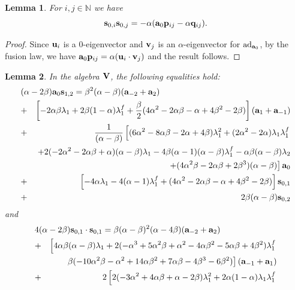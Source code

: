 \documentclass[a4paper]{amsart}
\newtheorem{lemma}{Lemma}[section]
\newcommand{\N}{{\mathbb N}}
\newcommand{\Vo}{{\bf V}}
\newcommand{\ad}{{\rm ad}}
\newcommand{\lmu}{\lambda_1}
\newcommand{\lmf}{\lambda_1^f}
\newcommand{\lmd}{\lambda_2}
\newcommand{\bv}{{\bf v}}
\newcommand{\ba}{{\bf a}}
\newcommand{\bu}{{\bf u}}
\newcommand{\bs}{{\bf s}}
\newcommand{\bp}{{\bf p}}
\newcommand{\bq}{{\bf q}}
\begin{document}
  \begin{lemma}
  \label{psi}
 For $i,j\in \N$ we have
 \begin{equation}\label{ss}
 \bs_{0,i} \bs_{0,j}=-\alpha (\ba_0\bp_{ij}- \alpha \bq_{ij}).
 \end{equation}
\end{lemma}
 \begin{proof}
Since $\bu_i$ is a $0$-eigenvector and $\bv_j$ is  an $\alpha$-eigenvector for $\ad_{\ba_0}$, 
 by the fusion law, we have $\ba_0\bp_{ij}=\alpha(\bu_i\cdot \bv_j)$ and the result follows.  
\end{proof}



\begin{lemma}
\label{a0s2f}
In the algebra $\Vo$, the following equalities hold:
\begin{eqnarray*}
\lefteqn{( \alpha-2   \beta)\ba_0\bs_{1,2}=\beta^2( \alpha- \beta)(\ba_{-2}+\ba_2)} \\
&+&\left [-2   \alpha   \beta   \lmu+2\beta(1- \alpha) \lmf+\frac{\beta}{2}(4   \alpha^2  -2   \alpha   \beta- \alpha   +4   \beta^2-2   \beta)\right ](\ba_1+\ba_{-1})\\
&+& \frac{1}{(\alpha-\beta)}\left [(6   \alpha^2-8   \alpha   \beta-2   \alpha+4   \beta)   \lmu^2+(2   \alpha^2-2   \alpha)   \lmu   \lmf \right .\\
&&+2(-2   \alpha^2-2   \alpha   \beta+ \alpha)(\alpha-\beta) \lmu-4\beta(   \alpha -1)(\alpha-\beta)   \lmf - \alpha   \beta(\alpha-\beta)   \lmd \\
&& \left .+(4   \alpha^2   \beta-2   \alpha   \beta+2   \beta^3)(\alpha-\beta)\right ]\ba_0\\
&+& \left [-4\alpha \lmu-4(\alpha-1)\lmf+(4\alpha^2-2   \alpha   \beta- \alpha+4   \beta^2-2   \beta)\right ]\bs_{0,1}\\
&+& 2\beta ( \alpha -  \beta)\bs_{0,2}
\end{eqnarray*}
and 
\begin{eqnarray*}
\lefteqn{4(\alpha-2\beta)\bs_{0,1} \cdot \bs_{0,1}=\beta(\alpha-\beta)^2(\alpha-4\beta)(\ba_{-2}+\ba_2)}\\
&+ &\left[4\alpha\beta(\alpha-\beta)\lmu+2(-\alpha^3+5\alpha^2\beta+\alpha^2-4\alpha\beta^2-5\alpha\beta+4\beta^2)\lmf \right .\\
& &\left .\beta(-10\alpha^2\beta-\alpha^2+14\alpha\beta^2+7\alpha\beta-4\beta^3-6\beta^2)\right ] (\ba_{-1}+\ba_1)\\
& +&2\left [2(-3\alpha^2+4 \alpha \beta+\alpha-2 \beta) \lmu^2+2\alpha(1-\alpha) \lmu \lmf \right .\\

\end{eqnarray*}
\end{lemma}
\end{document}
